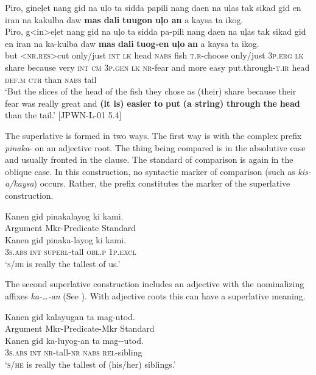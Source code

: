 \ea
Piro,  gineļet  nang  gid  na  uļo  ta  sidda  papili  nang  daen na  uļas  tak  sikad  gid  en  iran  na  kakulba  daw \textbf{mas}  \textbf{dali}  \textbf{tuugon}  \textbf{uļo  an}  a  kaysa  ta  ikog. \\\smallskip \gll Piro,  g<in>eļet  nang  gid  na  uļo  ta  sidda  pa-pili  nang  daen na  uļas  tak  sikad  gid  en  iran  na  ka-kulba  daw \textbf{mas}  \textbf{dali}  \textbf{tuog-en}  \textbf{uļo}  \textbf{an}  a  kaysa  ta  ikog. \\
but  <\textsc{nr.res}>cut  only/just  \textsc{int}  \textsc{lk}  head  \textsc{nabs}  fish  \textsc{t.r}-choose  only/just  3\textsc{p.erg}
\textsc{lk}  share  because  very  \textsc{int}  \textsc{cm}  3\textsc{p.gen}  \textsc{lk}  \textsc{nr}-fear  and
more  easy  put.through-\textsc{t.ir}  head  \textsc{def.m}  \textsc{ctr}  than  \textsc{nabs}  tail \\
\glt ‘But the slices of the head of the fish they chose as (their) share because their fear was really great and \textbf{(it is)} \textbf{easier} \textbf{to} \textbf{put} \textbf{(a string)} \textbf{through} \textbf{the} \textbf{head} than the tail.’ [JPWN-L-01 5.4]
\z

The superlative is formed in two ways. The first way is with the complex prefix \textit{pinaka}{}- on an adjective root. The thing being compared is in the absolutive case and usually fronted in the clause. The standard of comparison is again in the oblique case. In this construction, no syntactic marker of comparison (such as \textit{kis-a/kaysa}) occurs. Rather, the prefix constitutes the marker of the superlative construction.

\ea
Kanen  gid  pinakalayog  ki  kami. \\\smallskip
Argument  Mkr-Predicate  Standard \\
\gll Kanen  gid  pinaka-layog  ki  kami. \\
3\textsc{s.abs}  \textsc{int}  \textsc{superl}-tall  \textsc{obl.p}  1\textsc{p.excl} \\
\glt ‘\textsc{s/he} is really the tallest of us.’
\z

The second superlative construction includes an adjective with the nominalizing affixes \textit{ka-…-an} (See  ). With adjective roots this can have a superlative meaning.

\ea
Kanen  gid  kalayugan  ta  mag-utod. \\\smallskip
Argument  Mkr-Predicate-Mkr  Standard \\
\gll Kanen  gid  ka-luyog-an  ta  mag-{}-utod. \\
3\textsc{s.abs}  \textsc{int}  \textsc{nr}-tall-\textsc{nr}  \textsc{nabs}  \textsc{rel}-sibling \\
\glt ‘\textsc{s/he} is really the tallest of (his/her) siblings.’
\z

